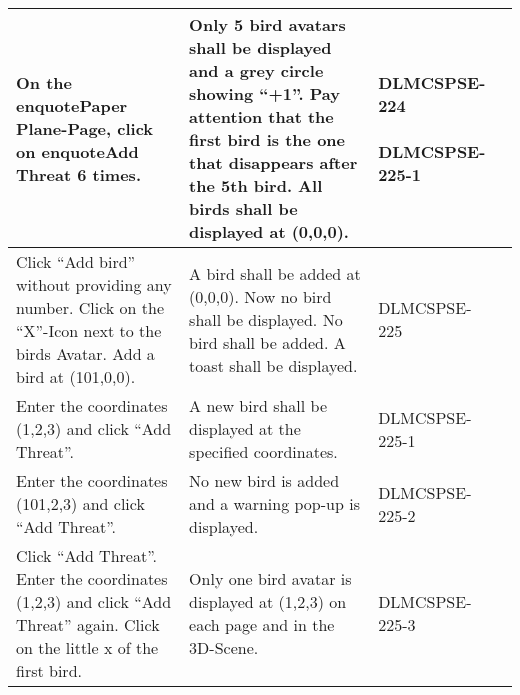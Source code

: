 \begin{xltabular}{\textwidth}{|X|X|M{3cm}|M{3cm}|}
\hline 
 \endlastfoot 
On the enquote{Paper Plane}-Page, click on enquote{Add Threat} 6 times. & Only 5 bird avatars shall be displayed and a grey circle showing {\ttfamily\enquote{+1}}. Pay attention that the first bird is the one that disappears after the 5th bird. \newline All birds shall be displayed at {\ttfamily(0,0,0)}. & {\color{purpleT}\ttfamily DLMCSPSE-224 \newline\newline DLMCSPSE-225-1} &  \\ \hline 
  Click \enquote{Add bird} without providing any number. \newline Click on the \enquote{X}-Icon next to the birds Avatar. \newline Add a bird at {\ttfamily (101,0,0)}. & A bird shall be added at {\ttfamily (0,0,0)}. \newline Now no bird shall be displayed. \newline No bird shall be added. A toast shall be displayed. & {\color{purpleT}\ttfamily DLMCSPSE-225} &  \\ \hline 
  Enter the coordinates {\ttfamily(1,2,3)} and click \enquote{Add Threat}. & A new bird shall be displayed at the specified coordinates. & {\color{purpleT}\ttfamily DLMCSPSE-225-1} &  \\ \hline 
  Enter the coordinates {\ttfamily (101,2,3)} and click \enquote{Add Threat}. & No new bird is added and a warning pop-up is displayed. & {\color{purpleT}\ttfamily DLMCSPSE-225-2} &  \\ \hline 
  Click \enquote{Add Threat}. Enter the coordinates {\ttfamily (1,2,3)} and click \enquote{Add Threat} again. \newline Click on the little x of the first bird. & Only one bird avatar is displayed at {\ttfamily (1,2,3)} on each page and in the 3D-Scene. & {\color{purpleT}\ttfamily DLMCSPSE-225-3} &  \\ \hline 

\end{xltabular}
